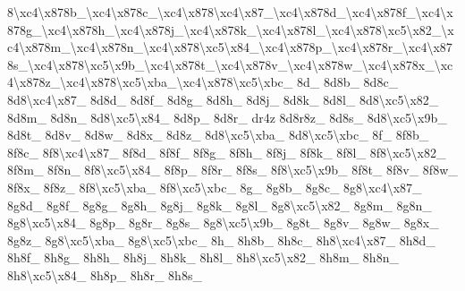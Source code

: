 \begin{DoxyCompactItemize}
8\textbackslash{}xc4\textbackslash{}x878b\-\_\textbackslash{}xc4\textbackslash{}x878c\-\_\textbackslash{}xc4\textbackslash{}x878\textbackslash{}xc4\textbackslash{}x87\-\_\textbackslash{}xc4\textbackslash{}x878d\-\_\textbackslash{}xc4\textbackslash{}x878f\-\_\textbackslash{}xc4\textbackslash{}x878g\-\_\textbackslash{}xc4\textbackslash{}x878h\-\_\textbackslash{}xc4\textbackslash{}x878j\-\_\textbackslash{}xc4\textbackslash{}x878k\-\_\textbackslash{}xc4\textbackslash{}x878l\-\_\textbackslash{}xc4\textbackslash{}x878\textbackslash{}xc5\textbackslash{}x82\-\_\textbackslash{}xc4\textbackslash{}x878m\-\_\textbackslash{}xc4\textbackslash{}x878n\-\_\textbackslash{}xc4\textbackslash{}x878\textbackslash{}xc5\textbackslash{}x84\-\_\textbackslash{}xc4\textbackslash{}x878p\-\_\textbackslash{}xc4\textbackslash{}x878r\-\_\textbackslash{}xc4\textbackslash{}x878s\-\_\textbackslash{}xc4\textbackslash{}x878\textbackslash{}xc5\textbackslash{}x9b\-\_\textbackslash{}xc4\textbackslash{}x878t\-\_\textbackslash{}xc4\textbackslash{}x878v\-\_\textbackslash{}xc4\textbackslash{}x878w\-\_\textbackslash{}xc4\textbackslash{}x878x\-\_\textbackslash{}xc4\textbackslash{}x878z\-\_\textbackslash{}xc4\textbackslash{}x878\textbackslash{}xc5\textbackslash{}xba\-\_\textbackslash{}xc4\textbackslash{}x878\textbackslash{}xc5\textbackslash{}xbc\-\_\- 8d\-\_\- 8d8b\-\_\- 8d8c\-\_\- 8d8\textbackslash{}xc4\textbackslash{}x87\-\_\- 8d8d\-\_\- 8d8f\-\_\- 8d8g\-\_\- 8d8h\-\_\- 8d8j\-\_\- 8d8k\-\_\- 8d8l\-\_\- 8d8\textbackslash{}xc5\textbackslash{}x82\-\_\- 8d8m\-\_\- 8d8n\-\_\- 8d8\textbackslash{}xc5\textbackslash{}x84\-\_\- 8d8p\-\_\- 8d8r\-\_\- dr4z 8d8r8z\-\_\- 8d8s\-\_\- 8d8\textbackslash{}xc5\textbackslash{}x9b\-\_\- 8d8t\-\_\- 8d8v\-\_\- 8d8w\-\_\- 8d8x\-\_\- 8d8z\-\_\- 8d8\textbackslash{}xc5\textbackslash{}xba\-\_\- 8d8\textbackslash{}xc5\textbackslash{}xbc\-\_\- 8f\-\_\- 8f8b\-\_\- 8f8c\-\_\- 8f8\textbackslash{}xc4\textbackslash{}x87\-\_\- 8f8d\-\_\- 8f8f\-\_\- 8f8g\-\_\- 8f8h\-\_\- 8f8j\-\_\- 8f8k\-\_\- 8f8l\-\_\- 8f8\textbackslash{}xc5\textbackslash{}x82\-\_\- 8f8m\-\_\- 8f8n\-\_\- 8f8\textbackslash{}xc5\textbackslash{}x84\-\_\- 8f8p\-\_\- 8f8r\-\_\- 8f8s\-\_\- 8f8\textbackslash{}xc5\textbackslash{}x9b\-\_\- 8f8t\-\_\- 8f8v\-\_\- 8f8w\-\_\- 8f8x\-\_\- 8f8z\-\_\- 8f8\textbackslash{}xc5\textbackslash{}xba\-\_\- 8f8\textbackslash{}xc5\textbackslash{}xbc\-\_\- 8g\-\_\- 8g8b\-\_\- 8g8c\-\_\- 8g8\textbackslash{}xc4\textbackslash{}x87\-\_\- 8g8d\-\_\- 8g8f\-\_\- 8g8g\-\_\- 8g8h\-\_\- 8g8j\-\_\- 8g8k\-\_\- 8g8l\-\_\- 8g8\textbackslash{}xc5\textbackslash{}x82\-\_\- 8g8m\-\_\- 8g8n\-\_\- 8g8\textbackslash{}xc5\textbackslash{}x84\-\_\- 8g8p\-\_\- 8g8r\-\_\- 8g8s\-\_\- 8g8\textbackslash{}xc5\textbackslash{}x9b\-\_\- 8g8t\-\_\- 8g8v\-\_\- 8g8w\-\_\- 8g8x\-\_\- 8g8z\-\_\- 8g8\textbackslash{}xc5\textbackslash{}xba\-\_\- 8g8\textbackslash{}xc5\textbackslash{}xbc\-\_\- 8h\-\_\- 8h8b\-\_\- 8h8c\-\_\- 8h8\textbackslash{}xc4\textbackslash{}x87\-\_\- 8h8d\-\_\- 8h8f\-\_\- 8h8g\-\_\- 8h8h\-\_\- 8h8j\-\_\- 8h8k\-\_\- 8h8l\-\_\- 8h8\textbackslash{}xc5\textbackslash{}x82\-\_\- 8h8m\-\_\- 8h8n\-\_\- 8h8\textbackslash{}xc5\textbackslash{}x84\-\_\- 8h8p\-\_\- 8h8r\-\_\- 8h8s\-\_\- 
\end{DoxyCompactItemize}

